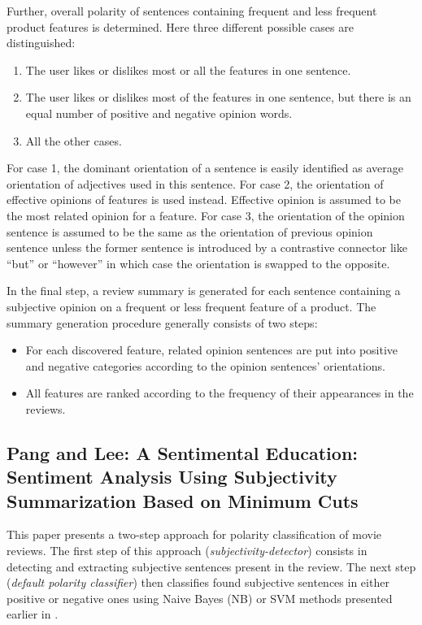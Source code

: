 \documentclass[a4paper,11pt]{article}
\begin{document}
Further, overall polarity of sentences containing frequent and less frequent
product features is determined.  Here three different possible cases are
distinguished:
\begin{enumerate}
  \item The user likes or dislikes most or all the features in one sentence.
  \item The user likes or dislikes most of the features in one sentence, but
    there is an equal number of positive and negative opinion words.
  \item All the other cases.
\end{enumerate}
For case 1, the dominant orientation of a sentence is easily identified as
average orientation of adjectives used in this sentence.  For case 2, the
orientation of effective opinions of features is used instead.  Effective
opinion is assumed to be the most related opinion for a feature.  For case 3,
the orientation of the opinion sentence is assumed to be the same as the
orientation of previous opinion sentence unless the former sentence is
introduced by a contrastive connector like ``but'' or ``however'' in which
case the orientation is swapped to the opposite.

In the final step, a review summary is generated for each sentence containing
a subjective opinion on a frequent or less frequent feature of a product.  The
summary generation procedure generally consists of two steps:
\begin{itemize}
  \item For each discovered feature, related opinion sentences are put into
    positive and negative categories according to the opinion sentences'
    orientations.

  \item All features are ranked according to the frequency of their
    appearances in the reviews.
\end{itemize}

\subsection{Pang and Lee: A Sentimental Education: Sentiment Analysis Using Subjectivity
               Summarization Based on Minimum Cuts\cite{Pang-Lee-04}}

This paper presents a two-step approach for polarity classification of
movie reviews.  The first step of this approach
(\textit{subjectivity-detector}) consists in detecting and extracting
subjective sentences present in the review.  The next step
(\textit{default polarity classifier}) then classifies found
subjective sentences in either positive or negative ones using Naive
Bayes (NB) or SVM methods presented earlier in \cite{Pang-Lee-02}.
\end{document}
